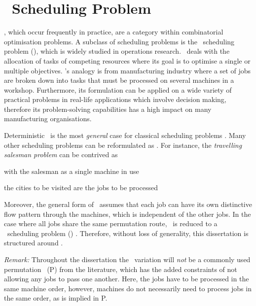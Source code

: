 
\chapter{\Jsp\ Scheduling Problem}\label{ch:scheduling}
, which occur frequently in practice, are a category within combinatorial optimisation problems. 
A subclass of scheduling problems is the \jsp\ scheduling problem (\JSP), which 
is widely studied in operations research. 
\Jsp\ deals with the allocation of tasks of competing resources where its goal is to optimise a single or multiple objectives. 
\Jsp's analogy is from manufacturing industry where a set of jobs are broken down into tasks that must be processed on several machines in a workshop. 
Furthermore, its formulation can be applied on a wide variety of practical problems in real-life applications which involve decision making, therefore its problem-solving capabilities has a high impact on many manufacturing organisations. %

Deterministic \JSP\ is the most \emph{general} case for classical scheduling problems \citep{Jain99}. 
Many other scheduling problems can be reformulated as \JSP. 
For instance, the \textit{travelling salesman problem} can be contrived as \jsp
\begin{enumerate*}[label={{}}]
    \item with the salesman as a single machine in use 
    \item the cities to be visited are the jobs to be processed
\end{enumerate*}
Moreover, the general form of \JSP\ assumes that each job can have its own 
distinctive flow pattern through the machines, which is independent of the 
other jobs. 
In the case where all jobs share the same permutation route, \jsp\ is reduced 
to a \fsp\ scheduling problem (\FSP) \citep{Guinet1998,Tay08}. 
Therefore, without loss of generality, this dissertation is structured around 
\JSP. 

\emph{Remark:} Throughout the dissertation the \FSP\ variation will \emph{not} 
be a commonly used permutation \fsp\ (P\FSP) from the literature, which has 
the added constraints of not allowing any jobs to pass one another.
Here, the jobs have to be processed in the same machine order, however, 
machines do not necessarily need to process jobs in the same order, as is 
implied in P\FSP.

